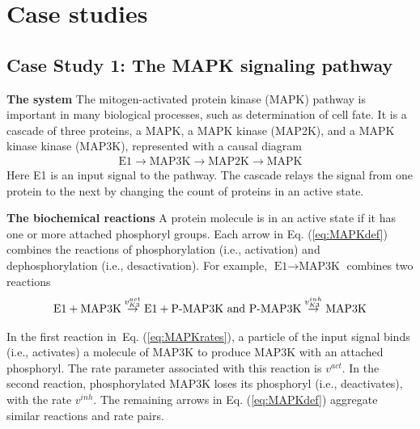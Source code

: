 \documentclass{article}
\def\eqref#1{Eq. (\ref{#1})}
\begin{document}

\section{Case studies}


\subsection{Case Study 1: The MAPK signaling pathway \label{sec:mapk_def}}

{\bf The system} The mitogen-activated protein kinase (MAPK) pathway is important in many biological processes, such as determination of cell fate. It is a cascade of three proteins, a MAPK, a MAPK kinase (MAP2K), and a MAPK kinase kinase (MAP3K), represented with a causal diagram \cite{huang1996,qiao2007bistability}
\begin{eqnarray}
& \text{E1} \rightarrow \text{MAP3K} \rightarrow \text{MAP2K} \rightarrow \text{MAPK} & \label{eq:MAPKdef}
\end{eqnarray}
Here E1 is an input signal to the pathway. The cascade relays the signal from one protein to the next by changing the count of proteins in an active state.

{\bf The biochemical reactions} A protein molecule is in an active state if it has one or more attached phosphoryl groups. Each arrow in \eqref{eq:MAPKdef} combines the reactions of  phosphorylation (i.e., activation) and dephosphorylation (i.e., desactivation). For example, $\text{E1} \rightarrow \text{MAP3K}$ combines two reactions \vspace{-2mm}
\begin{eqnarray}
\text{E1} + \text{MAP3K} \overset{v^{act}_{K3}}{\rightarrow} \text{E1} + \text{P-MAP3K} \ \mbox{and}\
\text{P-MAP3K} \overset{v^{inh}_{K3}}{\rightarrow} \text{MAP3K} \label{eq:MAPKrates}
\vspace{-2mm}
\end{eqnarray}

\vspace{-.1in}
In the first reaction in~\eqref{eq:MAPKrates}, a particle of the input signal  binds (i.e., activates) a molecule of MAP3K to produce MAP3K with an attached phosphoryl. The rate parameter associated with this reaction is $v^{act}$. In the second reaction, phosphorylated MAP3K loses its phosphoryl (i.e., deactivates), with the rate $v^{inh}$.  The remaining arrows in \eqref{eq:MAPKdef} aggregate similar reactions and rate pairs.%
\end{document}
